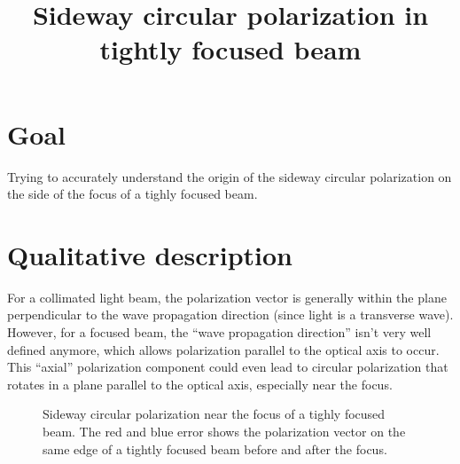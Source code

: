 \documentclass[10pt,fleqn]{article}
\title{Sideway circular polarization in tightly focused beam}
\begin{document}
\maketitle

\section{Goal}
Trying to accurately understand the origin of the sideway circular polarization
on the side of the focus of a tighly focused beam.\\

\section{Qualitative description}
For a collimated light beam, the polarization vector is generally within
the plane perpendicular to the wave propagation direction
(since light is a transverse wave).
However, for a focused beam, the ``wave propagation direction''
isn't very well defined anymore,
which allows polarization parallel to the optical axis to occur.
This ``axial'' polarization component could even lead to circular polarization
that rotates in a plane parallel to the optical axis, especially near the focus.\\

\begin{figure}[h]
  \centering
  \caption{Sideway circular polarization near the focus of a tighly focused beam.
    The red and blue error shows the polarization vector on the same edge
    of a tightly focused beam before and after the focus.}
  \label{fig:focus}
\end{figure}
\end{document}

